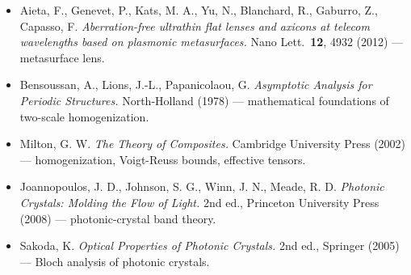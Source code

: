 \documentclass[11pt,a4paper]{article}
\begin{document}
\begin{itemize}[noitemsep]
\item Aieta, F., Genevet, P., Kats, M. A., Yu, N., Blanchard, R., Gaburro, Z., Capasso, F. \textit{Aberration-free ultrathin flat lenses and axicons at telecom wavelengths based on plasmonic metasurfaces.} Nano Lett.\ \textbf{12}, 4932 (2012) --- metasurface lens.
\item Bensoussan, A., Lions, J.-L., Papanicolaou, G. \textit{Asymptotic Analysis for Periodic Structures.} North-Holland (1978) --- mathematical foundations of two-scale homogenization.
\item Milton, G. W. \textit{The Theory of Composites.} Cambridge University Press (2002) --- homogenization, Voigt-Reuss bounds, effective tensors.
\item Joannopoulos, J. D., Johnson, S. G., Winn, J. N., Meade, R. D. \textit{Photonic Crystals: Molding the Flow of Light.} 2nd ed., Princeton University Press (2008) --- photonic-crystal band theory.
\item Sakoda, K. \textit{Optical Properties of Photonic Crystals.} 2nd ed., Springer (2005) --- Bloch analysis of photonic crystals.
\end{itemize}
\end{document}
